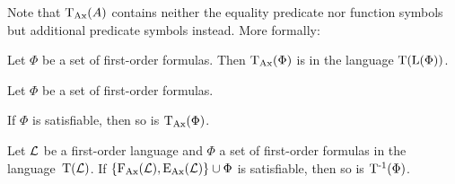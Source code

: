 Note that $\operatorname{\operatorname{T}_{Ax}}(A)$ contains neither the equality predicate nor function symbols but additional predicate symbols instead. More formally:


\begin{lemma}
	\label{def:trans_lang}
	Let $\Phi$ be a set of first-order formulas. Then $\operatorname{\operatorname{T}_{Ax}}(\Phi)$ is in the language $\operatorname{T}(\operatorname{L}(\Phi))$.
\end{lemma}

\begin{prop}
	\label{prop:trans_sat_equiv}
	Let $\Phi$ be a set of first-order formulas.
	\begin{compactenum}
		\item If $\Phi$ is satisfiable, then so is $\operatorname{\operatorname{T}_{Ax}}(\Phi)$.
		\item Let $\operatorname{\mathcal{L}}$ be a first-order language and $\Phi$ a set of first-order formulas in the language~$\operatorname{T}(\operatorname{\mathcal{L}})$.
			If $\{\operatorname{F_{Ax}}(\operatorname{\mathcal{L}}), \operatorname{E_{Ax}}(\operatorname{\mathcal{L}})\} \cup \Phi $ is satisfiable, then so is $\operatorname{T^{-1}}(\Phi)$.
	\end{compactenum}
\end{prop}
